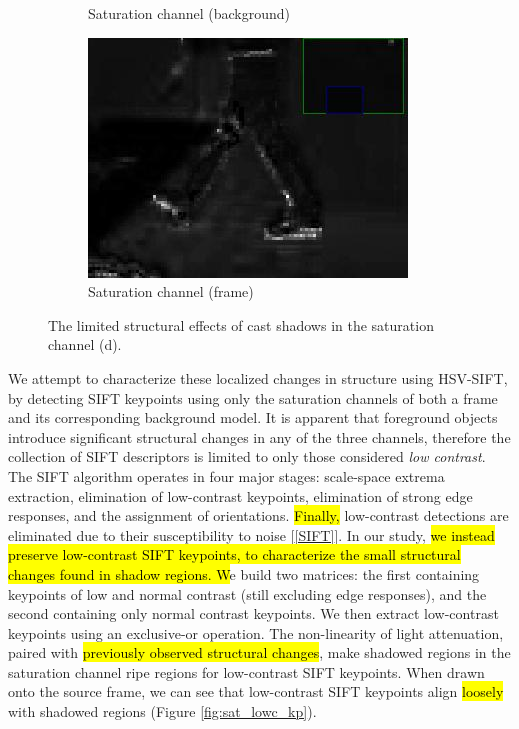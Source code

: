 \begin{figure}
\begin{subfigure}{.49\linewidth}
  \caption{Saturation channel (background)}
\end{subfigure}
\hfill
\begin{subfigure}{.49\linewidth}
  \includegraphics[width=1\linewidth]{figures/lab_sat_fg_zoom_0161.jpg}
  \caption{Saturation channel (frame)}
\end{subfigure}

\caption{The limited structural effects of cast shadows in the saturation channel (d).}
\label{fig:sat_struct}
\end{figure}

We attempt to characterize these localized changes in structure using HSV-SIFT, by detecting SIFT keypoints using only the saturation channels of both a frame and its corresponding background model. It is apparent that foreground objects introduce significant structural changes in any of the three channels,  therefore the collection of SIFT descriptors is limited to only those considered \textit{low contrast}. The SIFT algorithm operates in four major stages: scale-space extrema extraction, elimination of low-contrast keypoints, elimination of strong edge responses, and the assignment of orientations. \hl{Finally,} low-contrast detections are eliminated due to their susceptibility to noise [\ref{SIFT}]. In our study, \hl{we instead preserve low-contrast SIFT keypoints, to characterize the small structural changes found in shadow regions. W}e build two matrices: the first containing keypoints of low and normal contrast (still excluding edge responses), and the second containing only normal contrast keypoints. We then extract low-contrast keypoints using an exclusive-or operation. The non-linearity of light attenuation, paired with \hl{previously observed structural changes}, make shadowed regions in the saturation channel ripe regions for low-contrast SIFT keypoints. When drawn onto the source frame, we can see that low-contrast SIFT keypoints align \hl{loosely} with shadowed regions (Figure \ref{fig:sat_lowc_kp}). 

